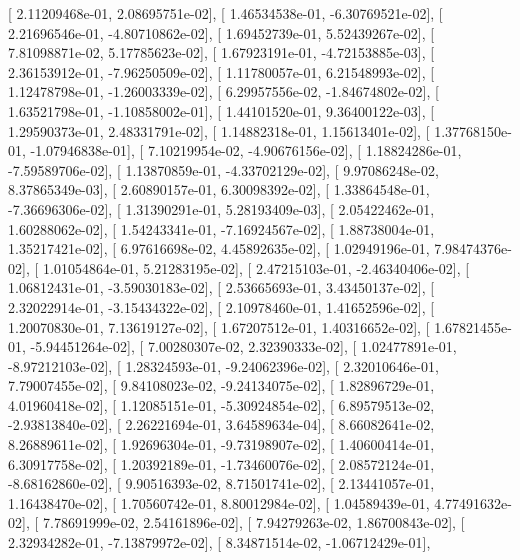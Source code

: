 \documentclass{article}
\begin{document}
       [  2.11209468e-01,   2.08695751e-02],
       [  1.46534538e-01,  -6.30769521e-02],
       [  2.21696546e-01,  -4.80710862e-02],
       [  1.69452739e-01,   5.52439267e-02],
       [  7.81098871e-02,   5.17785623e-02],
       [  1.67923191e-01,  -4.72153885e-03],
       [  2.36153912e-01,  -7.96250509e-02],
       [  1.11780057e-01,   6.21548993e-02],
       [  1.12478798e-01,  -1.26003339e-02],
       [  6.29957556e-02,  -1.84674802e-02],
       [  1.63521798e-01,  -1.10858002e-01],
       [  1.44101520e-01,   9.36400122e-03],
       [  1.29590373e-01,   2.48331791e-02],
       [  1.14882318e-01,   1.15613401e-02],
       [  1.37768150e-01,  -1.07946838e-01],
       [  7.10219954e-02,  -4.90676156e-02],
       [  1.18824286e-01,  -7.59589706e-02],
       [  1.13870859e-01,  -4.33702129e-02],
       [  9.97086248e-02,   8.37865349e-03],
       [  2.60890157e-01,   6.30098392e-02],
       [  1.33864548e-01,  -7.36696306e-02],
       [  1.31390291e-01,   5.28193409e-03],
       [  2.05422462e-01,   1.60288062e-02],
       [  1.54243341e-01,  -7.16924567e-02],
       [  1.88738004e-01,   1.35217421e-02],
       [  6.97616698e-02,   4.45892635e-02],
       [  1.02949196e-01,   7.98474376e-02],
       [  1.01054864e-01,   5.21283195e-02],
       [  2.47215103e-01,  -2.46340406e-02],
       [  1.06812431e-01,  -3.59030183e-02],
       [  2.53665693e-01,   3.43450137e-02],
       [  2.32022914e-01,  -3.15434322e-02],
       [  2.10978460e-01,   1.41652596e-02],
       [  1.20070830e-01,   7.13619127e-02],
       [  1.67207512e-01,   1.40316652e-02],
       [  1.67821455e-01,  -5.94451264e-02],
       [  7.00280307e-02,   2.32390333e-02],
       [  1.02477891e-01,  -8.97212103e-02],
       [  1.28324593e-01,  -9.24062396e-02],
       [  2.32010646e-01,   7.79007455e-02],
       [  9.84108023e-02,  -9.24134075e-02],
       [  1.82896729e-01,   4.01960418e-02],
       [  1.12085151e-01,  -5.30924854e-02],
       [  6.89579513e-02,  -2.93813840e-02],
       [  2.26221694e-01,   3.64589634e-04],
       [  8.66082641e-02,   8.26889611e-02],
       [  1.92696304e-01,  -9.73198907e-02],
       [  1.40600414e-01,   6.30917758e-02],
       [  1.20392189e-01,  -1.73460076e-02],
       [  2.08572124e-01,  -8.68162860e-02],
       [  9.90516393e-02,   8.71501741e-02],
       [  2.13441057e-01,   1.16438470e-02],
       [  1.70560742e-01,   8.80012984e-02],
       [  1.04589439e-01,   4.77491632e-02],
       [  7.78691999e-02,   2.54161896e-02],
       [  7.94279263e-02,   1.86700843e-02],
       [  2.32934282e-01,  -7.13879972e-02],
       [  8.34871514e-02,  -1.06712429e-01],
\end{document}

